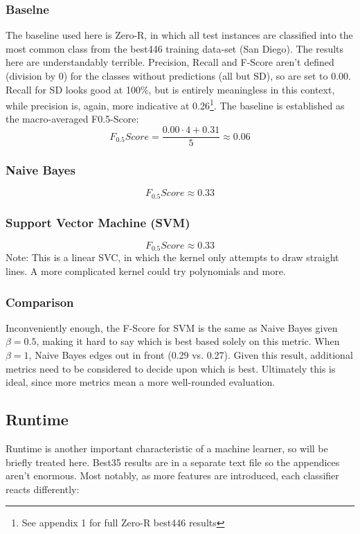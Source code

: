\documentclass[twocolumn]{article}
\begin{document}
\subsubsection{Baselne}
The baseline used here is Zero-R, in which all test instances are classified into the most common class from the best446 training data-set (San Diego). The results here are understandably terrible. Precision, Recall and F-Score aren't defined (division by 0) for the classes without predictions (all but SD), so are set to 0.00. Recall for SD looks good at 100\%, but is entirely meaningless in this context, while precision is, again, more indicative at 0.26\footnote{See appendix 1 for full Zero-R best446 results}. The baseline is established as the macro-averaged F0.5-Score:
\begin{equation}
F_{0.5}Score = \frac{0.00 \cdot 4 + 0.31}{5} \approx 0.06
\end{equation}

\subsubsection{Naive Bayes}
\begin{equation}
F_{0.5}Score \approx 0.33
\end{equation}
\subsubsection{Support Vector Machine (SVM)}
\begin{equation}
F_{0.5}Score \approx 0.33
\end{equation}
Note: This is a linear SVC, in which the kernel only attempts to draw straight lines. A more complicated kernel could try polynomials and more.
\clearpage
\subsubsection{Comparison}
Inconveniently enough, the F-Score for SVM is the same as Naive Bayes given $\beta = 0.5$, making it hard to say which is best based solely on this metric. When $\beta = 1$, Naive Bayes edges out in front (0.29 vs. 0.27). Given this result, additional metrics need to be considered to decide upon which is best. Ultimately this is ideal, since more metrics mean a more well-rounded evaluation.

\subsection{Runtime}
Runtime is another important characteristic of a machine learner, so will be briefly treated here. Best35 results are in a separate text file so the appendices aren't enormous. Most notably, as more features are introduced, each classifier reacts differently:
\end{document}
